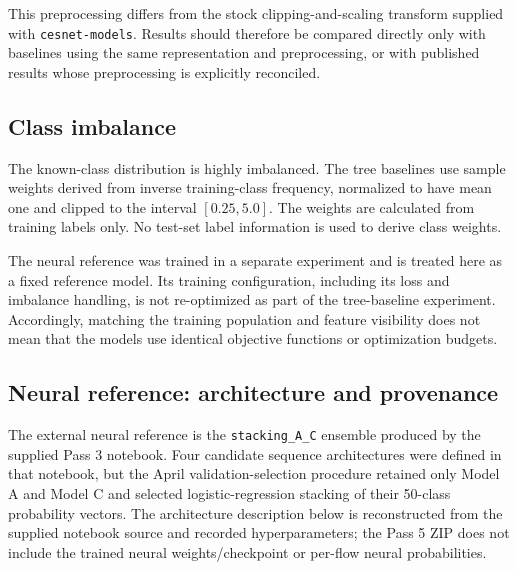\documentclass[conference]{IEEEtran}
\begin{document}
This preprocessing differs from the stock clipping-and-scaling transform supplied with \texttt{cesnet-models}. Results should therefore be compared directly only with baselines using the same representation and preprocessing, or with published results whose preprocessing is explicitly reconciled.

\subsection{Class imbalance}

The known-class distribution is highly imbalanced. The tree baselines use sample weights derived from inverse training-class frequency, normalized to have mean one and clipped to the interval $[0.25,5.0]$. The weights are calculated from training labels only. No test-set label information is used to derive class weights.

The neural reference was trained in a separate experiment and is treated here as a fixed reference model. Its training configuration, including its loss and imbalance handling, is not re-optimized as part of the tree-baseline experiment. Accordingly, matching the training population and feature visibility does not mean that the models use identical objective functions or optimization budgets.

\subsection{Neural reference: architecture and provenance}
\label{sec:neural}

The external neural reference is the \texttt{stacking\_A\_C} ensemble produced by the supplied Pass 3 notebook. Four candidate sequence architectures were defined in that notebook, but the April validation-selection procedure retained only Model A and Model C and selected logistic-regression stacking of their 50-class probability vectors. The architecture description below is reconstructed from the supplied notebook source and recorded hyperparameters; the Pass 5 ZIP does not include the trained neural weights/checkpoint or per-flow neural probabilities.
\end{document}
